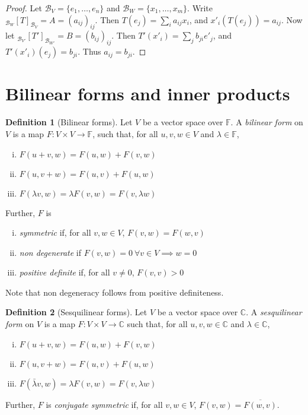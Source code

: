 \documentclass[10pt,fleqn]{article}
\newcommand{\comps}{\mathbb{C}}
\newcommand{\field}{\mathbb{F}}
\newcommand{\basis}{\mathcal{B}}
\theoremstyle{definition} \newtheorem{defn}{Definition}[section]
\theoremstyle{plain}      \newtheorem{thm}[defn]{Theorem}
\theoremstyle{plain}      \newtheorem{prop}[defn]{Proposition}
\theoremstyle{plain}      \newtheorem{lem}[defn]{Lemma}
\theoremstyle{plain}      \newtheorem{cor}[defn]{Corollary}
\theoremstyle{plain}      \newtheorem{ad}[defn]{Addendum}
\theoremstyle{definition} \newtheorem{ex}[defn]{Example}
\theoremstyle{definition} \newtheorem{rem}[defn]{Remark}
\numberwithin{equation}{subsection}
\begin{document}
\begin{proof}
    Let $\basis_V=\{e_1,\ldots,e_n\}$ and $\basis_W=\{x_1,\ldots,x_m\}$.
    Write $_{\basis_W}[T]_{\basis_V}=A=(a_{ij})_{ij}$.
    Then $T(e_j)=\sum_i a_{ij}x_i$, and $x'_i(T(e_j))=a_{ij}$.
    Now let $_{\basis_{V'}}[T']_{\basis_{W'}}=B=(b_{ij})_{ij}$.
    Then $T'(x'_i)=\sum_j b_{ji}e'_j$, and $T'(x'_i)(e_j)=b_{ji}$.
    Thus $a_{ij}=b_{ji}$.
\end{proof}


\section{Bilinear forms and inner products}

\begin{defn}[Bilinear forms]
    Let $V$ be a vector space over $\field$.
    A \emph{bilinear form} on $V$ is a map $F:V\times V\to\field$, such that, for all $u,v,w\in V$ and $\lambda\in\field$,
    \begin{enumerate}[(i)]
        \item $F(u+v,w)=F(u,w)+F(v,w)$
        \item $F(u,v+w)=F(u,v)+F(u,w)$
        \item $F(\lambda v,w)=\lambda F(v,w)=F(v,\lambda w)$
    \end{enumerate}
    Further, $F$ is
    \begin{enumerate}[(i)]
        \item \emph{symmetric} if, for all $v,w\in V$, $F(v,w)=F(w,v)$
        \item \emph{non degenerate} if $F(v,w)=0~\forall v\in V\implies w=0$
        \item \emph{positive definite} if, for all $v\neq0$, $F(v,v)>0$
    \end{enumerate}
    Note that non degeneracy follows from positive definiteness.
\end{defn}

\begin{defn}[Sesquilinear forms]
    Let $V$ be a vector space over $\comps$.
    A \emph{sesquilinear form} on $V$ is a map $F:V\times V\to\comps$ such that, for all $u,v,w\in\comps$ and $\lambda\in\comps$,
    \begin{enumerate}[(i)]
        \item $F(u+v,w)=F(u,w)+F(v,w)$
        \item $F(u,v+w)=F(u,v)+F(u,w)$
        \item $F(\bar{\lambda} v,w)=\lambda F(v,w)=F(v,\lambda w)$
    \end{enumerate}
    Further, $F$ is \emph{conjugate symmetric} if, for all $v,w\in V$, $F(v,w)=\overline{F(w,v)}$.
\end{defn}
\end{document}
